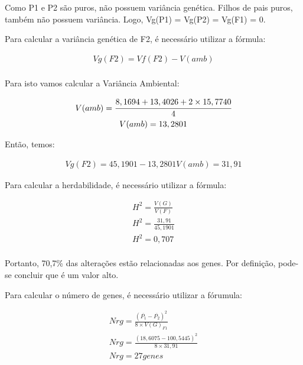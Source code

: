 \begin{solution} 



Como P1 e P2 são puros, não possuem variância genética. Filhos de pais puros, também não possuem variância. Logo, Vg(P1) = Vg(P2) = Vg(F1) = 0.

Para calcular a variância genética de F2, é necessário utilizar a fórmula:


\begin{multline}
	Vg(F2) = Vf(F2) - V(amb) \\
\end{multline}

Para isto vamos calcular a Variância Ambiental:

\begin{multline}
	V(amb) = \cfrac{8,1694 + 13,4026 + 2 \times 15,7740}{4} \\
	V(amb) = 13,2801
\end{multline}

Então, temos:

\begin{multline}
	Vg(F2) = 45,1901 - 13,2801
	V(amb) = 31,91
\end{multline}

\end{solution}

\begin{solution} [Herdabilidade]


Para calcular a herdabilidade, é necessário utilizar a fórmula:

\begin{multline}
	H^2 = \frac{V(G)}{V(F)} \\
	H^2 = \frac{31,91}{45,1901} \\
	H^2 = 0,707 \\	
\end{multline}

Portanto, 70,7\% das alterações estão relacionadas aos genes. Por definição, pode-se concluir que é um valor alto.

\end{solution}


\begin{solution} 

Para calcular o número de genes, é necessário utilizar a fórumula:

\begin{multline}
	Nrg = \frac{(\overline{P_1} - \overline{P_2})^2}{8 \times V(G)_{F1}} \\
	Nrg = \frac{(18,6075 - 100,5445)^2}{8 \times 31,91} \\
	Nrg = 27 genes
\end{multline}

\end{solution}



